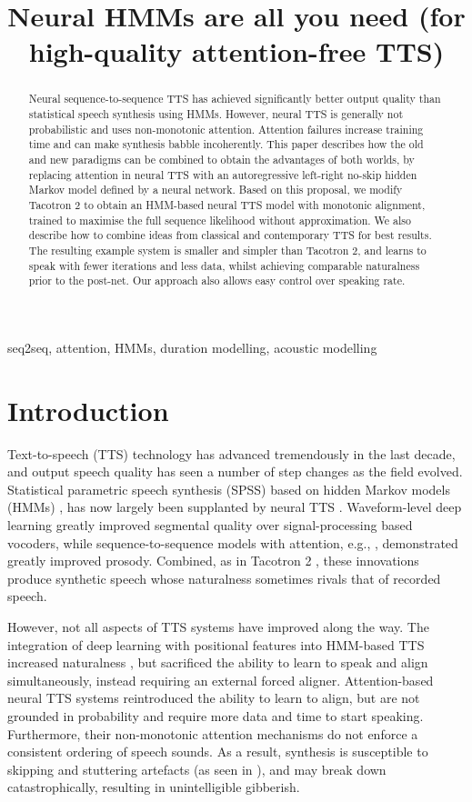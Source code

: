 \documentclass[british]{article}
\title{Neural HMMs are all you need (for high-quality attention-free TTS)}
\begin{document}
\maketitle
\begin{abstract}
Neural sequence-to-sequence TTS has achieved significantly better output quality than statistical speech synthesis using HMMs. However, neural TTS is generally not probabilistic and uses non-monotonic attention. Attention failures increase training time and can make synthesis babble incoherently. This paper describes how the old and new paradigms can be combined to obtain the advantages of both worlds, by replacing attention in neural TTS with an autoregressive left-right no-skip hidden Markov model defined by a neural network. Based on this proposal, we modify Tacotron 2 to obtain an HMM-based neural TTS model with monotonic alignment, trained to maximise the full sequence likelihood without approximation. We also describe how to combine ideas from classical and contemporary TTS for best results. The resulting example system is smaller and simpler than Tacotron 2, and learns to speak with fewer iterations and less data, whilst achieving comparable naturalness prior to the post-net. Our approach also allows easy control over speaking rate.
\end{abstract}
\begin{keywords}
seq2seq, attention, HMMs, duration modelling, acoustic modelling
\end{keywords}
\section{Introduction}
\label{sec:intro}
Text-to-speech (TTS) technology has advanced tremendously in the last decade, and output speech quality has seen a number of step changes as the field evolved.
Statistical parametric speech synthesis (SPSS) based on hidden Markov models (HMMs)
\cite{zen2009statistical}, 
has now largely been supplanted by neural TTS \cite{tan2021survey}.
Waveform-level deep learning
greatly improved segmental quality over signal-processing based vocoders,
while sequence-to-sequence models with attention, e.g., \cite{wang2017tacotron}, demonstrated greatly improved prosody.
Combined, as in Tacotron 2 \cite{shen2018natural}, these innovations produce synthetic speech whose naturalness sometimes rivals that of recorded speech.

However, not all aspects of TTS systems have improved along the way.
The integration of deep learning with positional features into HMM-based TTS increased naturalness \cite{watts2016hmms}, but sacrificed the ability to learn to speak and align simultaneously, instead requiring an external forced aligner.
Attention-based neural TTS systems \cite{wang2017tacotron} reintroduced the ability to learn to align, but are not grounded in probability and require more data and time to start speaking.
Furthermore,
their non-monotonic attention mechanisms do not enforce a consistent ordering of speech sounds.
As a result, synthesis is susceptible to skipping and stuttering artefacts (as seen in \cite{watts2019where}), and may break down catastrophically, resulting in unintelligible gibberish.
\end{document}
